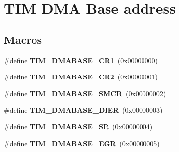 \hypertarget{group___t_i_m___d_m_a___base__address}{}\section{T\+IM D\+MA Base address}
\label{group___t_i_m___d_m_a___base__address}
\subsection*{Macros}
\begin{DoxyCompactItemize}
\item 
\#define {\bfseries T\+I\+M\+\_\+\+D\+M\+A\+B\+A\+S\+E\+\_\+\+C\+R1}~(0x00000000)\hypertarget{group___t_i_m___d_m_a___base__address_ga97bbe74e5ae8680c020a6b0f760d8909}{}\label{group___t_i_m___d_m_a___base__address_ga97bbe74e5ae8680c020a6b0f760d8909}

\item 
\#define {\bfseries T\+I\+M\+\_\+\+D\+M\+A\+B\+A\+S\+E\+\_\+\+C\+R2}~(0x00000001)\hypertarget{group___t_i_m___d_m_a___base__address_ga53d60ce92015bb60d608e60c45b1fdda}{}\label{group___t_i_m___d_m_a___base__address_ga53d60ce92015bb60d608e60c45b1fdda}

\item 
\#define {\bfseries T\+I\+M\+\_\+\+D\+M\+A\+B\+A\+S\+E\+\_\+\+S\+M\+CR}~(0x00000002)\hypertarget{group___t_i_m___d_m_a___base__address_ga184ad86a4c6d48263f57d3e7106675c4}{}\label{group___t_i_m___d_m_a___base__address_ga184ad86a4c6d48263f57d3e7106675c4}

\item 
\#define {\bfseries T\+I\+M\+\_\+\+D\+M\+A\+B\+A\+S\+E\+\_\+\+D\+I\+ER}~(0x00000003)\hypertarget{group___t_i_m___d_m_a___base__address_ga137d2e3858ae68333646fea6e04503da}{}\label{group___t_i_m___d_m_a___base__address_ga137d2e3858ae68333646fea6e04503da}

\item 
\#define {\bfseries T\+I\+M\+\_\+\+D\+M\+A\+B\+A\+S\+E\+\_\+\+SR}~(0x00000004)\hypertarget{group___t_i_m___d_m_a___base__address_gaf0da2213e3e7b6aaaa9b738ec85abc02}{}\label{group___t_i_m___d_m_a___base__address_gaf0da2213e3e7b6aaaa9b738ec85abc02}

\item 
\#define {\bfseries T\+I\+M\+\_\+\+D\+M\+A\+B\+A\+S\+E\+\_\+\+E\+GR}~(0x00000005)\hypertarget{group___t_i_m___d_m_a___base__address_gaff6d230aafb918047d62e877d21b3bdc}{}\label{group___t_i_m___d_m_a___base__address_gaff6d230aafb918047d62e877d21b3bdc}


\end{DoxyCompactItemize}
